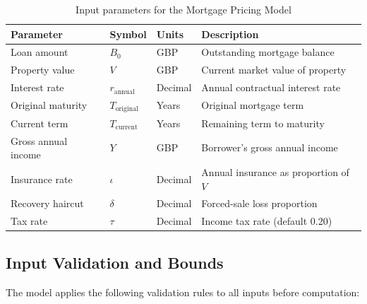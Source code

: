 \documentclass[11pt,a4paper]{article}
\begin{document}
\begin{table}[H]
    \centering
    \caption{Input parameters for the Mortgage Pricing Model}
    \label{tab:inputs}
    \begin{tabular}{@{}llll@{}}
        \toprule
        \textbf{Parameter} & \textbf{Symbol} & \textbf{Units} & \textbf{Description} \\
        \midrule
        Loan amount         & $B_0$                    & GBP     & Outstanding mortgage balance \\
        Property value      & $V$                      & GBP     & Current market value of property \\
        Interest rate       & $r_{\text{annual}}$      & Decimal & Annual contractual interest rate \\
        Original maturity   & $T_{\text{original}}$    & Years   & Original mortgage term \\
        Current term        & $T_{\text{current}}$     & Years   & Remaining term to maturity \\
        Gross annual income & $Y$                      & GBP     & Borrower's gross annual income \\
        Insurance rate      & $\iota$                  & Decimal & Annual insurance as proportion of $V$ \\
        Recovery haircut    & $\delta$                 & Decimal & Forced-sale loss proportion \\
        Tax rate            & $\tau$                   & Decimal & Income tax rate (default 0.20) \\
        \bottomrule
    \end{tabular}
\end{table}

\subsection{Input Validation and Bounds}

The model applies the following validation rules to all inputs before computation:
\end{document}
